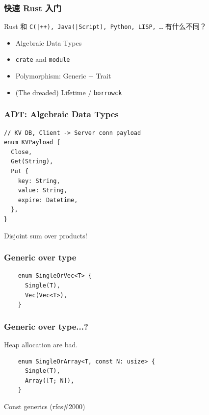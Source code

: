 \documentclass[UTF-8]{ctexbeamer}
\begin{document}
\begin{frame}
  \frametitle{快速 Rust 入门}

  Rust 和 \texttt{C(|++), Java(|Script), Python, LISP, \dots} 有什么不同？

  \pause
  \vspace{1em}

  \begin{itemize}
    \item Algebraic Data Types
    \item \texttt{crate} and \texttt{module}
    \item Polymorphism: Generic + Trait
    \item (The dreaded) Lifetime / \texttt{borrowck}
  \end{itemize}
\end{frame}

\begin{frame}[fragile]
  \frametitle{ADT: Algebraic Data Types}

  \begin{verbatim}
// KV DB, Client -> Server conn payload
enum KVPayload {
  Close,
  Get(String),
  Put {
    key: String,
    value: String,
    expire: Datetime,
  },
}
  \end{verbatim}

  \pause
  \vspace{1em}
  Disjoint sum over products!
\end{frame}

\begin{frame}[fragile]
  \frametitle{Generic over type}

  \begin{verbatim}
    enum SingleOrVec<T> {
      Single(T),
      Vec(Vec<T>),
    }
  \end{verbatim}
\end{frame}

\begin{frame}[fragile]
  \frametitle{Generic over type...?}

  Heap allocation are bad.

  \pause

  \begin{verbatim}
    enum SingleOrArray<T, const N: usize> {
      Single(T),
      Array([T; N]),
    }
  \end{verbatim}

  \pause
  \vspace{1em}

  Const generics (rfcs\#2000)
\end{frame}
\end{document}
